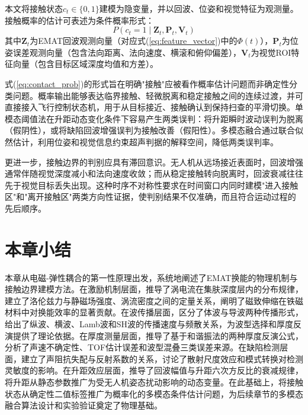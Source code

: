 本文将接触状态$c_t \in \{0, 1\}$建模为隐变量，并以回波、位姿和视觉特征为观测量。接触概率的估计可表述为条件概率形式：
\begin{equation}
P(c_t = 1 \mid \mathbf{Z}_t, \mathbf{P}_t, \mathbf{V}_t)
\label{eq:contact_prob}
\end{equation}
其中$\mathbf{Z}_t$为EMAT回波观测向量（对应式(\ref{eq:feature_vector})中的$\Phi(t)$），$\mathbf{P}_t$为位姿误差观测向量（包含法向距离、法向速度、横滚和俯仰偏差），$\mathbf{V}_t$为视觉ROI特征向量（包含目标区域深度均值和方差）。

式(\ref{eq:contact_prob})的形式旨在明确"接触"应被看作概率估计问题而非确定性分类问题。概率输出能够表达临界接触、轻微脱离和稳定接触之间的连续过渡，并可直接接入飞行控制状态机，用于从目标接近、接触确认到保持扫查的平滑切换。单模态阈值法在升距动态变化条件下容易产生两类误判：将升距瞬时波动误判为脱离（假阴性），或将缺陷回波增强误判为接触改善（假阳性）。多模态融合通过联合似然估计，利用位姿和视觉信息约束超声判据的解释空间，降低两类误判率。

更进一步，接触边界的判别应具有滞回意识。无人机从远场接近表面时，回波增强通常伴随视觉深度减小和法向速度收敛；而从稳定接触转向脱离时，回波衰减往往先于视觉目标丢失出现。这种时序不对称性要求在时间窗口内同时建模"进入接触区"和"离开接触区"两类方向性证据，使判别结果不仅准确，而且符合运动过程的先后顺序。

\section{本章小结}

本章从电磁-弹性耦合的第一性原理出发，系统地阐述了EMAT换能的物理机制与接触边界建模方法。在激励机制层面，推导了涡电流在集肤深度层内的分布规律，建立了洛伦兹力与静磁场强度、涡流密度之间的定量关系，阐明了磁致伸缩在铁磁材料中对换能效率的显著贡献。在波传播层面，区分了体波与导波两种传播形式，给出了纵波、横波、Lamb波和SH波的传播速度与频散关系，为波型选择和厚度反演提供了理论依据。在厚度测量层面，推导了基于和谐振法的两种厚度反演公式，分析了声速不确定性、TOF估计误差和波型混叠三类误差来源。在缺陷检测层面，建立了声阻抗失配与反射系数的关系，讨论了散射尺度效应和模式转换对检测灵敏度的影响。在升距效应层面，推导了回波幅值与升距六次方反比的衰减规律，将升距从静态参数推广为受无人机姿态扰动影响的动态变量。在此基础上，将接触状态从确定性二值标签推广为概率化的多模态条件估计问题，为后续章节的多模态融合算法设计和实验验证奠定了物理基础。

